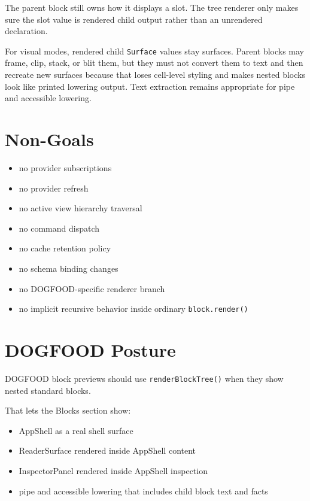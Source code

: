 The parent block still owns how it displays a slot. The tree renderer only makes sure the slot value is rendered child output rather than an unrendered declaration.

For visual modes, rendered child \texttt{S\allowbreak{}u\allowbreak{}r\allowbreak{}f\allowbreak{}a\allowbreak{}c\allowbreak{}e} values stay surfaces. Parent blocks may frame, clip, stack, or blit them, but they must not convert them to text and then recreate new surfaces because that loses cell-level styling and makes nested blocks look like printed lowering output. Text extraction remains appropriate for pipe and accessible lowering.

\section{Non-Goals}\label{record-129-non-goals}

\begin{itemize}
\tightlist
\item
  no provider subscriptions
\item
  no provider refresh
\item
  no active view hierarchy traversal
\item
  no command dispatch
\item
  no cache retention policy
\item
  no schema binding changes
\item
  no DOGFOOD-specific renderer branch
\item
  no implicit recursive behavior inside ordinary \texttt{b\allowbreak{}l\allowbreak{}o\allowbreak{}c\allowbreak{}k\allowbreak{}.\allowbreak{}r\allowbreak{}e\allowbreak{}n\allowbreak{}d\allowbreak{}e\allowbreak{}r\allowbreak{}(\allowbreak{})}
\end{itemize}

\section{DOGFOOD Posture}\label{record-129-dogfood-posture}

DOGFOOD block previews should use \texttt{r\allowbreak{}e\allowbreak{}n\allowbreak{}d\allowbreak{}e\allowbreak{}r\allowbreak{}B\allowbreak{}l\allowbreak{}o\allowbreak{}c\allowbreak{}k\allowbreak{}T\allowbreak{}r\allowbreak{}e\allowbreak{}e\allowbreak{}(\allowbreak{})} when they show nested standard blocks.

That lets the Blocks section show:

\begin{itemize}
\tightlist
\item
  AppShell as a real shell surface
\item
  ReaderSurface rendered inside AppShell content
\item
  InspectorPanel rendered inside AppShell inspection
\item
  pipe and accessible lowering that includes child block text and facts
\end{itemize}

